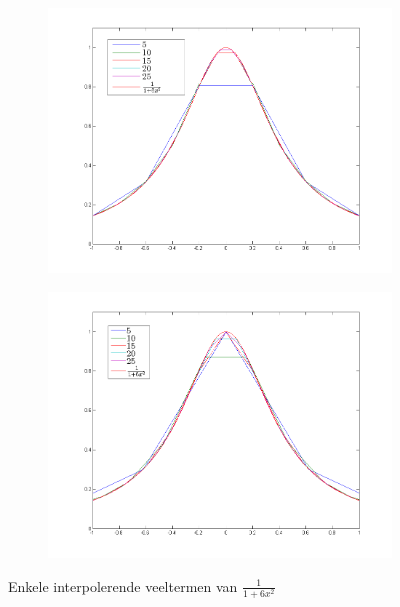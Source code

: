 \documentclass[a4paper, 12pt, titlepage]{report}
\begin{document}
\begin{figure}[htb]
\begin{subfigure}{0.5\textwidth}
\centering
\includegraphics[width=\textwidth]{expEqui.png}
\end{subfigure}
\begin{subfigure}{0.5\textwidth}
\centering
\includegraphics[width=\textwidth]{expCheb.png}
\end{subfigure}

\caption{Enkele interpolerende veeltermen van $\frac{1}{1+6x^2}$}
\label{interpolexp}
\end{figure}
\end{document}
